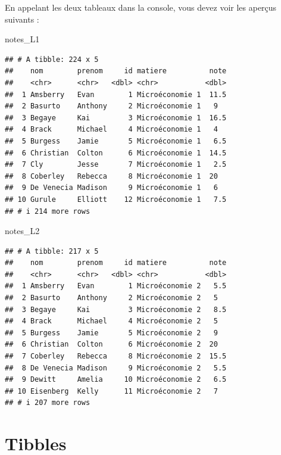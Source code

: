 \documentclass[
  11pt,
]{book}
\newenvironment{Shaded}{\begin{snugshade}}{\end{snugshade}}
\newcommand{\NormalTok}[1]{#1}
\numberwithin{equation}{section}
\numberwithin{countremarque}{section}
\begin{document}
En appelant les deux tableaux dans la console, vous devez voir les aperçus suivants :

\begin{Shaded}
\begin{Highlighting}[]
\NormalTok{notes\_L1}
\end{Highlighting}
\end{Shaded}

\begin{lstlisting}
## # A tibble: 224 x 5
##    nom        prenom     id matiere          note
##    <chr>      <chr>   <dbl> <chr>           <dbl>
##  1 Amsberry   Evan        1 Microéconomie 1  11.5
##  2 Basurto    Anthony     2 Microéconomie 1   9  
##  3 Begaye     Kai         3 Microéconomie 1  16.5
##  4 Brack      Michael     4 Microéconomie 1   4  
##  5 Burgess    Jamie       5 Microéconomie 1   6.5
##  6 Christian  Colton      6 Microéconomie 1  14.5
##  7 Cly        Jesse       7 Microéconomie 1   2.5
##  8 Coberley   Rebecca     8 Microéconomie 1  20  
##  9 De Venecia Madison     9 Microéconomie 1   6  
## 10 Gurule     Elliott    12 Microéconomie 1   7.5
## # i 214 more rows
\end{lstlisting}

\begin{Shaded}
\begin{Highlighting}[]
\NormalTok{notes\_L2}
\end{Highlighting}
\end{Shaded}

\begin{lstlisting}
## # A tibble: 217 x 5
##    nom        prenom     id matiere          note
##    <chr>      <chr>   <dbl> <chr>           <dbl>
##  1 Amsberry   Evan        1 Microéconomie 2   5.5
##  2 Basurto    Anthony     2 Microéconomie 2   5  
##  3 Begaye     Kai         3 Microéconomie 2   8.5
##  4 Brack      Michael     4 Microéconomie 2   5  
##  5 Burgess    Jamie       5 Microéconomie 2   9  
##  6 Christian  Colton      6 Microéconomie 2  20  
##  7 Coberley   Rebecca     8 Microéconomie 2  15.5
##  8 De Venecia Madison     9 Microéconomie 2   5.5
##  9 Dewitt     Amelia     10 Microéconomie 2   6.5
## 10 Eisenberg  Kelly      11 Microéconomie 2   7  
## # i 207 more rows
\end{lstlisting}

\hypertarget{tibbles}{%
\section{Tibbles}\label{tibbles}}
\end{document}
